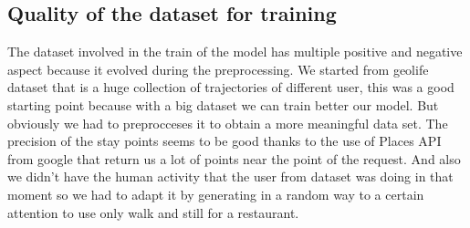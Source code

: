 \documentclass[../../main]{subfiles}
\begin{document}
\subsection{Quality of the dataset for training}

The dataset involved in the train of the model has multiple positive and negative aspect because it evolved during the preprocessing.
We started from geolife dataset that is a huge collection of trajectories of different user, this was a good starting point 
because with a big dataset we can train better our model. But obviously we had to preprocceses it to obtain a more meaningful data set. 
The precision of the stay points seems to be good thanks to the use of Places API from google that return us a lot of points near the point of the request.
And also we didn't have the human activity that the user from dataset was doing in that moment so we had to adapt it by generating in a random way to a certain
attention to use only walk and still for a restaurant.
\end{document}
